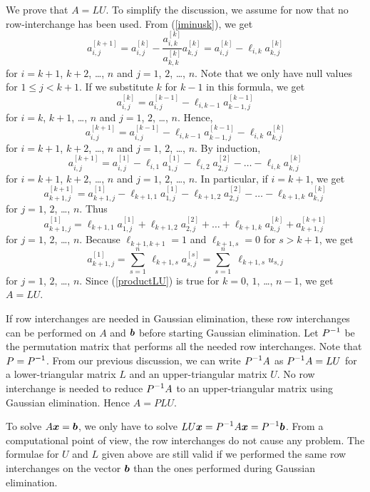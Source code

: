 We prove that $A=LU$.  To simplify the discussion, we assume for now
that no row-interchange has been used.  From (\ref{iminusk}), we get
\[
a^{[k+1]}_{i,j} = a^{[k]}_{i,j} - \frac{a^{[k]}_{i,k}}{a^{[k]}_{k,k}}
a^{[k]}_{k,j} =  a^{[k]}_{i,j} - \ell_{i,k} a^{[k]}_{k,j}
\]
for $i=k+1$, $k+2$, \ldots, $n$ and $j=1$, $2$, \ldots, $n$.
Note that we only have null values for $1 \leq j < k+1$.
If we substitute $k$ for $k-1$ in this formula, we get
\[
a^{[k]}_{i,j} = a^{[k-1]}_{i,j} - \ell_{i,k-1} a^{[k-1]}_{k-1,j} 
\]
for $i=k$, $k+1$, \ldots, $n$ and $j=1$, $2$, \ldots, $n$.
Hence,
\[
a^{[k+1]}_{i,j}=a^{[k-1]}_{i,j}-\ell_{i,k-1}a^{[k-1]}_{k-1,j}-\ell_{i,k}a^{[k]}_{k,j}
\]
for $i=k+1$, $k+2$, \ldots, $n$ and $j=1$, $2$, \ldots, $n$.
By induction,
\[
a^{[k+1]}_{i,j}=a^{[1]}_{i,j} -
\ell_{i,1}a^{[1]}_{1,j}-\ell_{i,2}a^{[2]}_{2,j} - \ldots
-\ell_{i,k}a^{[k]}_{k,j}
\]
for $i=k+1$, $k+2$, \ldots, $n$ and $j=1$, $2$, \ldots, $n$.
In particular, if $i=k+1$, we get
\[
a^{[k+1]}_{k+1,j}=a^{[1]}_{k+1,j} -
\ell_{k+1,1}a^{[1]}_{1,j}-\ell_{k+1,2}a^{[2]}_{2,j} - \ldots
-\ell_{k+1,k}a^{[k]}_{k,j}
\]
for $j=1$, $2$, \ldots, $n$.
Thus
\[
a^{[1]}_{k+1,j} = \ell_{k+1,1}a^{[1]}_{1,j} + \ell_{k+1,2}a^{[2]}_{2,j} + \ldots
+ \ell_{k+1,k}a^{[k]}_{k,j} + a^{[k+1]}_{k+1,j}
\]
for $j=1$, $2$, \ldots, $n$.
Because $\ell_{k+1,k+1} = 1$ and $\ell_{k+1,s}=0$ for $s>k+1$, we get
\begin{equation}\label{productLU}
a^{[1]}_{k+1,j} = \sum_{s=1}^n\, \ell_{k+1,s} a^{[s]}_{s,j}
= \sum_{s=1}^n\; \ell_{k+1,s} u_{s,j}
\end{equation}
for $j=1$, $2$, \ldots, $n$.  Since (\ref{productLU}) is true for
$k=0$, $1$, \ldots, $n-1$, we get $A=LU$.

If row interchanges are needed in Gaussian elimination, these row
interchanges can be performed on $A$ and $\bm{b}$ before starting
Gaussian elimination.  Let $\displaystyle P^{-1}$ be the permutation matrix that
performs all the needed row interchanges.  Note that $\displaystyle P=P^{-1}$.
From our previous discussion, we can write
$\displaystyle P^{-1}A$ as $\displaystyle P^{-1}A=LU$
for a lower-triangular matrix $L$ and an upper-triangular matrix $U$.
No row interchange is needed to reduce $\displaystyle P^{-1}A$ to an
upper-triangular matrix using Gaussian elimination.  Hence $A=PLU$.

To solve $A\bm{x} = \bm{b}$, we only have to solve
$\displaystyle LU \bm{x} = P^{-1}A\bm{x}=P^{-1}\bm{b}$.
From a computational point of view, the row interchanges do not cause
any problem.  The formulae for $U$ and $L$ given above are still valid
if we performed the same row interchanges on the vector $\bm{b}$ than
the ones performed during Gaussian elimination.

